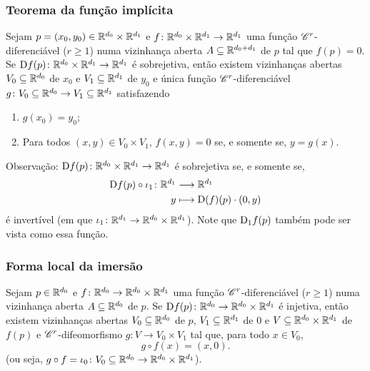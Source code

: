\subsubsection{Teorema da função implícita}

\begin{proposition}

Sejam $p=(x_0,y_0) \in \mathbb{R}^{d_0} \times \mathbb{R}^{d_1}$ e $f\colon \mathbb{R}^{d_0} \times \mathbb{R}^{d_1} \to \mathbb{R}^{d_1}$ uma função $\mathscr{C}^r$-diferenciável ($r \geq 1$) numa vizinhança aberta $A \subseteq \mathbb{R}^{d_0+d_1}$ de $p$ tal que $f(p)=0$.
Se $\mathrm{D} f(p)\colon \mathbb{R}^{d_0} \times \mathbb{R}^{d_1} \to \mathbb{R}^{d_1}$ é sobrejetiva, então existem vizinhanças abertas $V_0 \subseteq \mathbb{R}^{d_0}$ de $x_0$ e $V_1 \subseteq \mathbb{R}^{d_1}$ de $y_0$ e única função $\mathscr{C}^r$-diferenciável $g\colon V_0 \subseteq \mathbb{R}^{d_0} \to V_1 \subseteq \mathbb{R}^{d_1}$ satisfazendo
	\begin{enumerate}
	\item $g(x_0)=y_0$;
	\item Para todos $(x,y) \in V_0 \times V_1$, $f(x,y)=0$ se, e somente se, $y=g(x)$.
	\end{enumerate}
\end{proposition}

Observação: $\mathrm{D} f(p)\colon \mathbb{R}^{d_0} \times \mathbb{R}^{d_1} \to \mathbb{R}^{d_1}$ é sobrejetiva se, e somente se,
	\begin{align*}
	{\mathrm{D}f(p) \circ \iota_1}\colon {\mathbb{R}^{d_1}} &\longrightarrow {\mathbb{R}^{d_1}} \\{y} &\longmapsto \mathrm{D}(f)(p) \cdot (0,y)
	\end{align*}
é invertível (em que $\iota_1\colon \mathbb{R}^{d_1} \to \mathbb{R}^{d_0} \times \mathbb{R}^{d_1}$).  Note que $\mathrm{D}_1 f(p)$ também pode ser vista como essa função.

\subsubsection{Forma local da imersão}

\begin{proposition}

Sejam $p \in \mathbb{R}^{d_0}$ e $f\colon \mathbb{R}^{d_0} \to \mathbb{R}^{d_0} \times \mathbb{R}^{d_1}$ uma função $\mathscr{C}^r$-diferenciável ($r \geq 1$) numa vizinhança aberta $A \subseteq \mathbb{R}^{d_0}$ de $p$. Se $\mathrm{D} f(p) \colon \mathbb{R}^{d_0} \to \mathbb{R}^{d_0} \times \mathbb{R}^{d_1}$ é injetiva, então existem vizinhanças abertas $V_0 \subseteq \mathbb{R}^{d_0}$ de $p$, $V_1 \subseteq \mathbb{R}^{d_1}$ de $0$ e $V \subseteq \mathbb{R}^{d_0} \times \mathbb{R}^{d_1}$ de $f(p)$ e $\mathscr{C}^r$-difeomorfismo $g\colon V \to V_0 \times V_1$ tal que, para todo $x \in V_0$,
	\begin{equation*}
	g \circ f(x)=(x,0).
	\end{equation*}
(ou seja, $g \circ f = \iota_0\colon V_0 \subseteq \mathbb{R}^{d_0} \to \mathbb{R}^{d_0} \times \mathbb{R}^{d_1}$).
\end{proposition}

